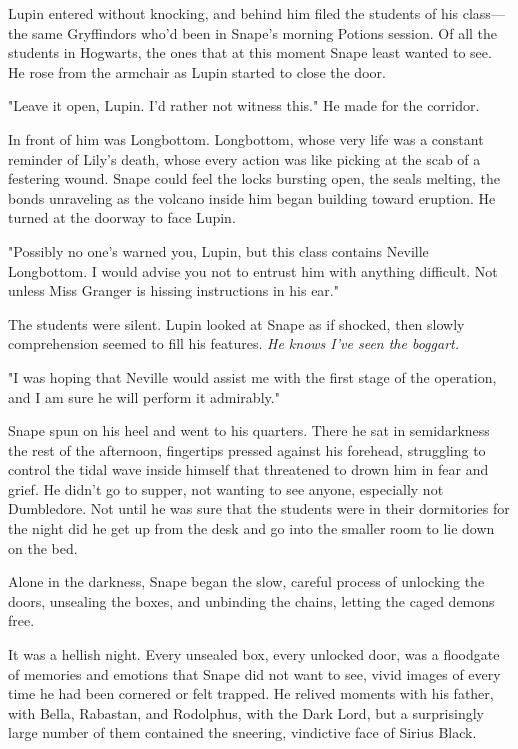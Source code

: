 Lupin entered without knocking, and behind him filed the students of his class—the same Gryffindors who'd been in Snape's morning Potions session. Of all the students in Hogwarts, the ones that at this moment Snape least wanted to see. He rose from the armchair as Lupin started to close the door.

"Leave it open, Lupin. I'd rather not witness this." He made for the corridor.

In front of him was Longbottom. Longbottom, whose very life was a constant reminder of Lily's death, whose every action was like picking at the scab of a festering wound. Snape could feel the locks bursting open, the seals melting, the bonds unraveling as the volcano inside him began building toward eruption. He turned at the doorway to face Lupin.

"Possibly no one's warned you, Lupin, but this class contains Neville Longbottom. I would advise you not to entrust him with anything difficult. Not unless Miss Granger is hissing instructions in his ear."

The students were silent. Lupin looked at Snape as if shocked, then slowly comprehension seemed to fill his features. \emph{He knows I've seen the boggart.}

"I was hoping that Neville would assist me with the first stage of the operation, and I am sure he will perform it admirably."

Snape spun on his heel and went to his quarters. There he sat in semidarkness the rest of the afternoon, fingertips pressed against his forehead, struggling to control the tidal wave inside himself that threatened to drown him in fear and grief. He didn't go to supper, not wanting to see anyone, especially not Dumbledore. Not until he was sure that the students were in their dormitories for the night did he get up from the desk and go into the smaller room to lie down on the bed.

Alone in the darkness, Snape began the slow, careful process of unlocking the doors, unsealing the boxes, and unbinding the chains, letting the caged demons free.

It was a hellish night. Every unsealed box, every unlocked door, was a floodgate of memories and emotions that Snape did not want to see, vivid images of every time he had been cornered or felt trapped. He relived moments with his father, with Bella, Rabastan, and Rodolphus, with the Dark Lord, but a surprisingly large number of them contained the sneering, vindictive face of Sirius Black.

